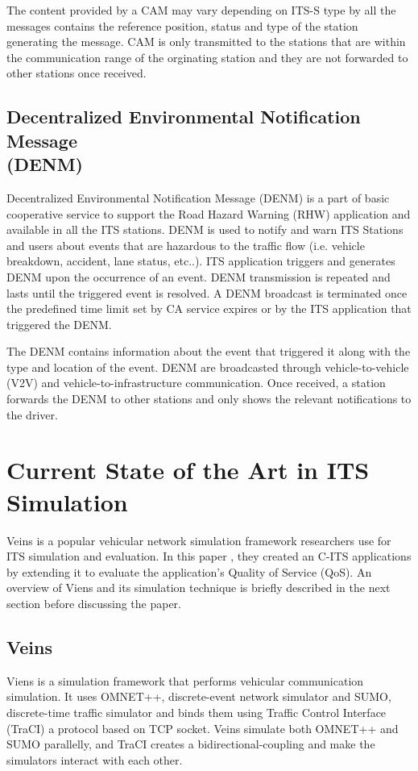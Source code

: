The content provided by a CAM may vary depending on ITS-S type by all the messages contains the reference position, status and type of the station generating the message. CAM is only transmitted to the stations that are within the communication range of the orginating station and they are not forwarded to other stations once received.
\subsection{Decentralized Environmental Notification Message \\(DENM)}
Decentralized Environmental Notification Message (DENM) \cite{etsiDENM} is a part of basic cooperative service to support the Road Hazard Warning (RHW) application and available in all the ITS stations. DENM is used to notify and warn ITS Stations and users about events that are hazardous to the traffic flow (i.e. vehicle breakdown, accident, lane status, etc..). ITS application triggers and generates DENM upon the occurrence of an event. DENM transmission is repeated and lasts until the triggered event is resolved. A DENM broadcast is terminated once the predefined time limit set by CA service expires or by the ITS application that triggered the DENM.

The DENM contains information about the event that triggered it along with the type and location of the event. DENM are broadcasted through vehicle-to-vehicle (V2V) and vehicle-to-infrastructure communication. Once received, a station forwards the DENM to other stations and only shows the relevant notifications to the driver.

\section{ Current State of the Art in ITS Simulation}
Veins is a popular vehicular network simulation framework researchers use for ITS simulation and evaluation. In this paper \cite{ITSref}, they created an C-ITS applications by extending it to evaluate the application's Quality of Service (QoS). An overview of Viens and its simulation technique is briefly described in the next section before discussing the paper.

\subsection{Veins}
Viens is a simulation framework that performs vehicular communication simulation. It uses OMNET++, discrete-event network simulator and SUMO, discrete-time traffic simulator and binds them using Traffic Control Interface (TraCI) a protocol based on TCP socket. Veins simulate both OMNET++ and SUMO parallelly, and TraCI creates a bidirectional-coupling and make the simulators interact with each other. 

